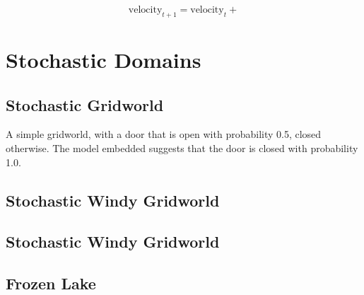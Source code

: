 \begin{equation}
\label{eqn:mc_dynamics}
\text{velocity}_{t+1} = \text{velocity}_t + 
\end{equation}

\cite{1606.01540, Moore90efficientmemory-based}

\section{Stochastic Domains}


\subsection{Stochastic Gridworld}
A simple gridworld, with a door that is open with probability 0.5, closed otherwise. The model embedded suggests that the door is closed with probability 1.0.

\subsection{Stochastic Windy Gridworld}
\cite{Sutton1998}

\subsection{Stochastic Windy Gridworld}
\subsection{Frozen Lake}
\cite{1606.01540}